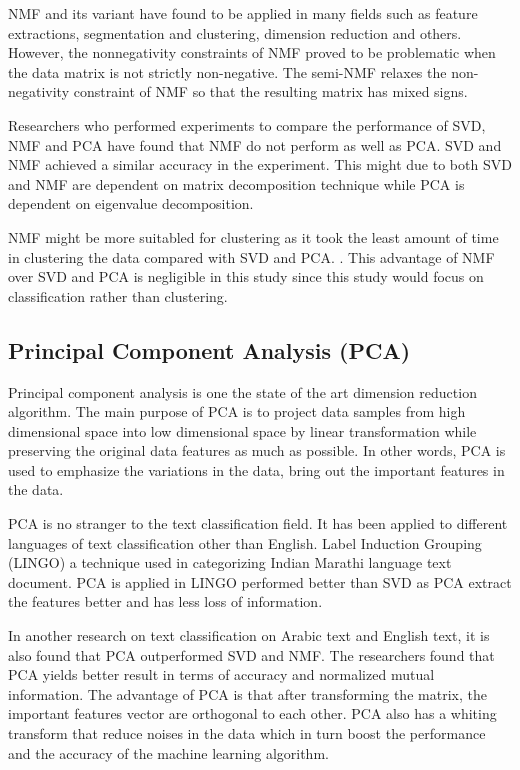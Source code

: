 NMF and its variant have found to be applied in many fields such as feature extractions, segmentation and clustering, dimension reduction and others. However, the nonnegativity constraints of NMF proved to be problematic when the data matrix is not strictly non-negative. The semi-NMF relaxes the non-negativity constraint of NMF so that the resulting matrix has mixed signs. \cite{semiNmfPca}
	
Researchers who performed experiments to compare the performance of SVD, NMF and PCA have found that NMF do not perform as well as PCA. SVD and NMF achieved a similar accuracy in the experiment. This might due to both SVD and NMF are dependent on matrix decomposition technique while PCA is dependent on eigenvalue decomposition. \cite{dimReducArabic}
	
NMF might be more suitabled for clustering as it took the least amount of time in clustering the data compared with SVD and PCA. \cite{dimReducArabic}. This advantage of NMF over SVD and PCA is negligible in this study since this study would focus on classification rather than clustering.
	
\subsection{Principal Component Analysis (PCA)}
Principal component analysis is one the state of the art dimension reduction algorithm. The main purpose of PCA is to project data samples from high dimensional space into low dimensional space by linear transformation while preserving the original data features as much as possible. \cite{pcaImage} In other words, PCA is used to emphasize the variations in the data, bring out the important features in the data.
	
PCA is no stranger to the text classification field. It has been applied to different languages of text classification other than English. Label Induction Grouping (LINGO) a technique used in categorizing Indian Marathi language text document. PCA is applied in LINGO performed better than SVD as PCA extract the features better and has less loss of information. \cite{lingo}
	
In another research on text classification on Arabic text and English text, it is also found that PCA outperformed SVD and NMF. The researchers found that PCA yields better result in terms of accuracy and normalized mutual information. The advantage of PCA is that after transforming the matrix, the important features vector are orthogonal to each other. PCA also has a whiting transform that reduce noises in the data which in turn boost the performance and the accuracy of the machine learning algorithm.\cite{dimReducArabic}
	
